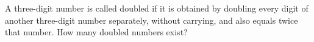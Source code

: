 A three-digit number is called doubled if it is obtained by doubling every digit of another three-digit number separately, without carrying, and also equals twice that number. How many doubled numbers exist?
